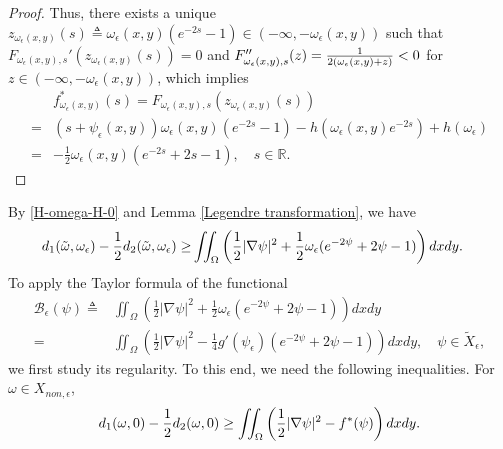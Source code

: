 \documentclass[1 [leqno, 11pt]{amsart}
\numberwithin{equation}{section}
\let\ep=\epsilon
\begin{document}
\begin{CJK*}{GBK}{song}
\begin{proof}
Thus, there exists a unique $z_{\omega_\ep(x,y)}(s)\triangleq\omega_\ep(x,y)(e^{-2s}-1)\in(-\infty,-\omega_\ep(x,y))$ such that $F_{\omega_\ep(x,y),s}'(z_{\omega_\ep(x,y)}(s))=0$ and $F_{\omega_\ep(x,y),s}''(z)={1\over 2(\omega_\ep(x,y)+z)}<0$ for $z\in(-\infty,-\omega_\ep(x,y))$, which implies
\begin{align*}
&f_{\omega_\ep(x,y)}^*(s)=F_{\omega_\ep(x,y),s}(z_{\omega_\ep(x,y)}(s))\\
 =& (s+\psi_\ep(x,y)) \omega_\ep(x,y)(e^{-2s}-1) - h(\omega_\ep(x,y)e^{-2s} ) + h(\omega_\ep)  \\
 =& - \frac 1 2 \omega_\ep(x,y) (e^{-2s} + 2s - 1),\quad s\in\mathbb{R}.
\end{align*}
\end{proof}
By \eqref{H-omega-H-0} and Lemma \ref{Legendre transformation}, we have
\begin{align*}
 d_{1}(\tilde\omega,\omega_\ep)-{1\over2}d_2(\tilde\omega,\omega_\ep)
 \geq &  \iint_{\Omega} \left(\frac 1 2 |\nabla \psi|^2 +\frac 1 2 \omega_\ep (e^{-2\psi} + 2\psi - 1)\right) dxdy.
 \end{align*}
To apply the Taylor formula of the  functional
\begin{align}\nonumber
\mathscr{B}_\ep( \psi)\triangleq &  \iint_{\Omega} \left(\frac 1 2 |\nabla \psi|^2 +\frac 1 2 \omega_\ep (e^{-2\psi} + 2\psi - 1)\right) dxdy\\\label{def-functional-B}
=  & \iint_{\Omega} \left(\frac 1 2 |\nabla \psi|^2 -\frac 1 4 g'(\psi_\ep)(e^{-2\psi} + 2\psi - 1)\right) dxdy,\quad \psi\in \tilde X_\ep,
\end{align}
we first study its regularity. To this end, we need the following inequalities.
For  $\omega \in  X_{non,\ep}$,
$$d_1(\omega,0)-{1\over2}d_2(\omega,0) \geq  \iint_{\Omega}\left(\frac 1 2 |\nabla\psi|^2- f^*(\psi) \right)dxdy.$$


\end{CJK*}
\end{document}
